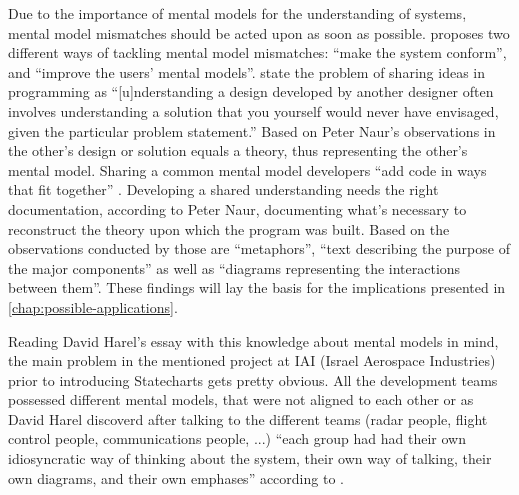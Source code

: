 Due to the importance of mental models for the understanding of systems, mental model mismatches should be acted upon as soon as possible.
\textcite{nielsen_mental_2010} proposes two different ways of tackling mental model mismatches: ``make the system conform'', and ``improve the users' mental models''.
\textcite{kitchenham_research_1990} state the problem of sharing ideas in programming as ``[u]nderstanding a design developed by another designer often involves understanding a solution that you yourself would never have envisaged, given the particular problem statement.''
Based on Peter Naur's observations in  the other's design or solution equals a theory, thus representing the other's mental model.
Sharing a common mental model developers ``add code in ways that fit together'' \autocite[239]{naur_programming_1985}.
Developing a shared understanding needs the right documentation, according to Peter Naur, documenting what's necessary to reconstruct the theory upon which the program was built.
Based on the observations conducted by \textcite[240]{naur_programming_1985} those are ``metaphors'', ``text describing the purpose of the major components'' as well as ``diagrams representing the interactions between them''.
These findings will lay the basis for the implications presented in \cref{chap:possible-applications}.

Reading David Harel's essay  with this knowledge about mental models in mind, the main problem in the mentioned project at IAI (Israel Aerospace Industries) prior to introducing Statecharts gets pretty obvious.
All the development teams possessed different mental models, that were not aligned to each other or as David Harel discoverd after talking to the different teams (radar people, flight control people, communications people, ...) ``each group had had their own idiosyncratic way of thinking about the system, their own way of talking, their own diagrams, and their own emphases'' according to \textcite{harel_statecharts_2007}.




